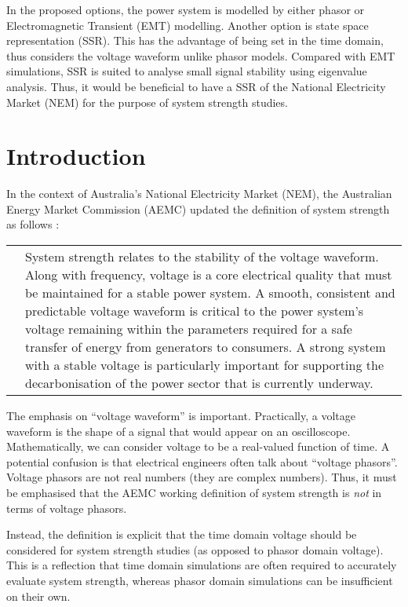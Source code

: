 \documentclass[11pt,a4paper,]{article}
\begin{document}
In the proposed options, the power system is modelled by either phasor or Electromagnetic Transient (EMT) modelling. Another option is state space representation (SSR). This has the advantage of being set in the time domain, thus considers the voltage waveform unlike phasor models. Compared with EMT simulations, SSR is suited to analyse small signal stability using eigenvalue analysis. Thus, it would be beneficial to have a SSR of the National Electricity Market (NEM) for the purpose of system strength studies.

\newpage

\tableofcontents

\newpage

\section{Introduction}

In the context of Australia's National Electricity Market (NEM), the Australian Energy Market Commission (AEMC) updated the definition of system strength as follows \cite{aemcnem}:

\begin{tabular}{l|p{}}
\quad & \small{System strength relates to the stability of the voltage waveform. Along with frequency, voltage is a core electrical quality that must be maintained for a stable power system. A smooth, consistent and predictable voltage waveform is critical to the power system's voltage remaining within the parameters required for a safe transfer of energy from generators to consumers. A strong system with a stable voltage is particularly important for supporting the decarbonisation of the power sector that is currently underway.}
\end{tabular}

The emphasis on ``voltage waveform'' is important. Practically, a voltage waveform is the shape of a signal that would appear on an oscilloscope. Mathematically, we can consider voltage to be a real-valued function of time. A potential confusion is that electrical engineers often talk about ``voltage phasors''. Voltage phasors are not real numbers (they are complex numbers). Thus, it must be emphasised that the AEMC working definition of system strength is \emph{not} in terms of voltage phasors.

Instead, the definition is explicit that the time domain voltage should be considered for system strength studies (as opposed to phasor domain voltage). This is a reflection that time domain simulations are often required to accurately evaluate system strength, whereas phasor domain simulations can be insufficient on their own\cite{emin2021system}.
\end{document}

